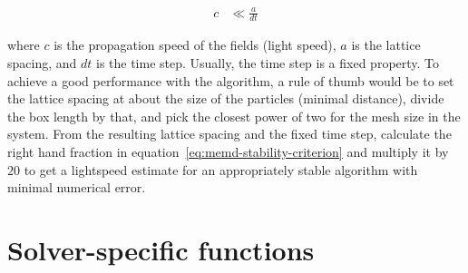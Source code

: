 \begin{align}
c & \ll  \frac{a}{dt} \label{eq:memd-stability-criterion}
\end{align}

where $c$ is the propagation speed of the fields (light speed), $a$ is the lattice spacing, and $dt$ is the time step. Usually, the time step is a fixed property. To achieve a good performance with the algorithm, a rule of thumb would be to set the lattice spacing at about the size of the particles (minimal distance), divide the box length by that, and pick the closest power of two for the mesh size in the system. From the resulting lattice spacing and the fixed time step, calculate the right hand fraction in equation~\eqref{eq:memd-stability-criterion} and multiply it by $20$ to get a lightspeed estimate for an appropriately stable algorithm with minimal numerical error.

\section{Solver-specific functions}
\label{sec:memd-functions}

